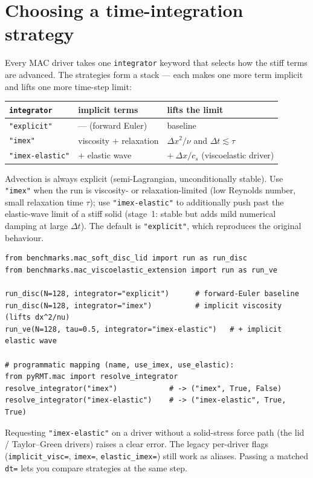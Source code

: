 \documentclass[11pt]{article}
\begin{document}
\section{Choosing a time-integration strategy}
Every MAC driver takes one \texttt{integrator} keyword that selects how the stiff
terms are advanced. The strategies form a stack --- each makes one more term implicit
and lifts one more time-step limit:
\begin{center}\small
\begin{tabular}{@{}lll@{}}
\toprule
\texttt{integrator} & implicit terms & lifts the limit \\
\midrule
\texttt{"explicit"} & --- (forward Euler) & baseline \\
\texttt{"imex"} & viscosity $+$ relaxation & $\Delta x^2/\nu$ and $\Delta t\lesssim\tau$ \\
\texttt{"imex-elastic"} & $+$ elastic wave & $+\ \Delta x/c_s$ (viscoelastic driver) \\
\bottomrule
\end{tabular}
\end{center}
Advection is always explicit (semi-Lagrangian, unconditionally stable). Use
\texttt{"imex"} when the run is viscosity- or relaxation-limited (low Reynolds number,
small relaxation time $\tau$); use \texttt{"imex-elastic"} to additionally push past
the elastic-wave limit of a stiff solid (stage~1: stable but adds mild numerical
damping at large $\Delta t$). The default is \texttt{"explicit"}, which reproduces the
original behaviour.
\begin{lstlisting}
from benchmarks.mac_soft_disc_lid import run as run_disc
from benchmarks.mac_viscoelastic_extension import run as run_ve

run_disc(N=128, integrator="explicit")      # forward-Euler baseline
run_disc(N=128, integrator="imex")          # implicit viscosity (lifts dx^2/nu)
run_ve(N=128, tau=0.5, integrator="imex-elastic")   # + implicit elastic wave

# programmatic mapping (name, use_imex, use_elastic):
from pyRMT.mac import resolve_integrator
resolve_integrator("imex")            # -> ("imex", True, False)
resolve_integrator("imex-elastic")    # -> ("imex-elastic", True, True)
\end{lstlisting}
Requesting \texttt{"imex-elastic"} on a driver without a solid-stress force path (the
lid / Taylor--Green drivers) raises a clear error. The legacy per-driver flags
(\texttt{implicit\_visc=}, \texttt{imex=}, \texttt{elastic\_imex=}) still work as
aliases. Passing a matched \texttt{dt=} lets you compare strategies at the same step.
\end{document}
